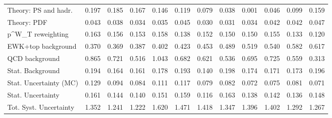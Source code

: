 \begin{tabular}{l|p{0.6cm}p{0.6cm}p{0.6cm}p{0.6cm}p{0.6cm}p{0.6cm}p{0.6cm}p{0.6cm}p{0.6cm}p{0.6cm}p{0.6cm}}
Theory: PS and hadr.                     & 0.197 & 0.185 & 0.167 & 0.146 & 0.119 & 0.079 & 0.038 & 0.001 & 0.046 & 0.099 & 0.159 \\
Theory: PDF                              & 0.043 & 0.038 & 0.034 & 0.035 & 0.045 & 0.030 & 0.031 & 0.034 & 0.042 & 0.042 & 0.047 \\
p^{W}_{T} reweighting                    & 0.163 & 0.156 & 0.153 & 0.158 & 0.138 & 0.152 & 0.150 & 0.150 & 0.155 & 0.133 & 0.120 \\
EWK+top background                       & 0.370 & 0.369 & 0.387 & 0.402 & 0.423 & 0.453 & 0.489 & 0.519 & 0.540 & 0.582 & 0.617 \\
QCD background                           & 0.865 & 0.721 & 0.516 & 1.043 & 0.682 & 0.621 & 0.536 & 0.695 & 0.725 & 0.559 & 0.313 \\
Stat. Background                         & 0.194 & 0.164 & 0.161 & 0.178 & 0.193 & 0.140 & 0.198 & 0.174 & 0.171 & 0.173 & 0.196 \\
Stat. Uncertainty (MC)                   & 0.129 & 0.094 & 0.084 & 0.111 & 0.117 & 0.079 & 0.082 & 0.072 & 0.075 & 0.081 & 0.071 \\
\hline
Stat. Uncertainty                        & 0.161 & 0.144 & 0.140 & 0.151 & 0.159 & 0.116 & 0.163 & 0.138 & 0.142 & 0.136 & 0.148 \\
\hline
Tot. Syst. Uncertainty                   & 1.352 & 1.241 & 1.222 & 1.620 & 1.471 & 1.418 & 1.347 & 1.396 & 1.402 & 1.292 & 1.267 \\
\hline
\end{tabular}
